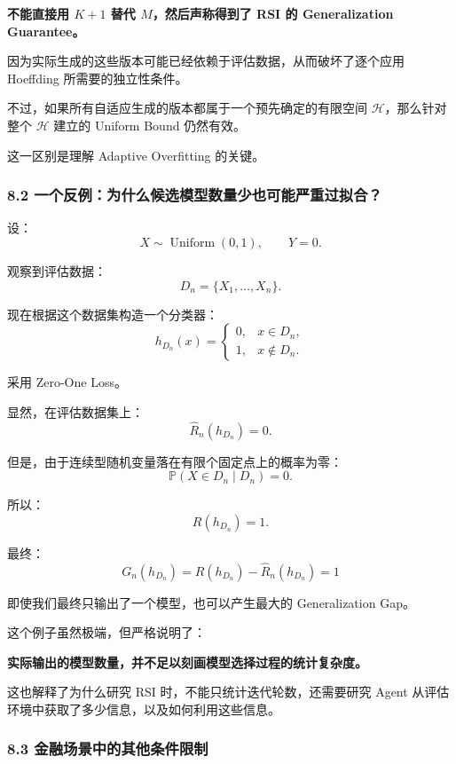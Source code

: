 \textbf{不能直接用 \(K+1\) 替代 \(M\)，然后声称得到了 RSI 的 Generalization Guarantee。}

因为实际生成的这些版本可能已经依赖于评估数据，从而破坏了逐个应用 Hoeffding 所需要的独立性条件。

不过，如果所有自适应生成的版本都属于一个预先确定的有限空间 \(\mathcal H\)，那么针对整个 \(\mathcal H\) 建立的 Uniform Bound 仍然有效。

这一区别是理解 Adaptive Overfitting 的关键。

\hypertarget{part-2-14-0001-ux4e00ux4e2aux53cdux4f8bux4e3aux4ec0ux4e48ux5019ux9009ux6a21ux578bux6570ux91cfux5c11ux4e5fux53efux80fdux4e25ux91cdux8fc7ux62dfux5408}{%
\subsubsection{8.2 一个反例：为什么候选模型数量少也可能严重过拟合？}\label{part-2-14-0001-ux4e00ux4e2aux53cdux4f8bux4e3aux4ec0ux4e48ux5019ux9009ux6a21ux578bux6570ux91cfux5c11ux4e5fux53efux80fdux4e25ux91cdux8fc7ux62dfux5408}}

设：
\[X\sim\operatorname{Uniform}(0,1),
\qquad Y=0.\]

观察到评估数据：
\[D_n=\{X_1,\ldots,X_n\}.\]

现在根据这个数据集构造一个分类器：
\[h_{D_n}(x)=
\begin{cases}
0,&x\in D_n,\\
1,&x\notin D_n.
\end{cases}\]

采用 Zero-One Loss。

显然，在评估数据集上：
\[\widehat R_n(h_{D_n})=0.\]

但是，由于连续型随机变量落在有限个固定点上的概率为零：
\[\mathbb P(X\in D_n\mid D_n)=0.\]

所以：
\[R(h_{D_n})=1.\]

最终：
\[\boxed{
G_n(h_{D_n})
=
R(h_{D_n})-\widehat R_n(h_{D_n})
=
1
}\]

即使我们最终只输出了一个模型，也可以产生最大的 Generalization Gap。

这个例子虽然极端，但严格说明了：

\textbf{实际输出的模型数量，并不足以刻画模型选择过程的统计复杂度。}

这也解释了为什么研究 RSI 时，不能只统计迭代轮数，还需要研究 Agent 从评估环境中获取了多少信息，以及如何利用这些信息。

\hypertarget{part-2-14-0001-ux91d1ux878dux573aux666fux4e2dux7684ux5176ux4ed6ux6761ux4ef6ux9650ux5236}{%
\subsubsection{8.3 金融场景中的其他条件限制}\label{part-2-14-0001-ux91d1ux878dux573aux666fux4e2dux7684ux5176ux4ed6ux6761ux4ef6ux9650ux5236}}

